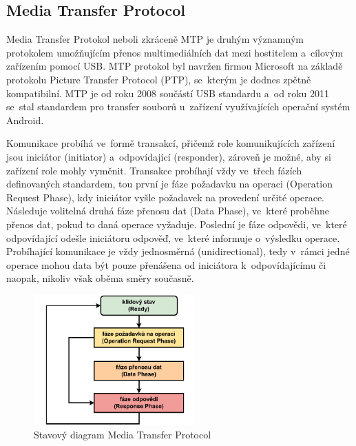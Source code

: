 \subsection{Media Transfer Protocol}
Media Transfer Protokol neboli zkráceně MTP je druhým významným protokolem umožňujícím přenos multimediálních dat mezi hostitelem a~cílovým zařízením pomocí USB. MTP protokol byl navržen firmou Microsoft na základě protokolu Picture Transfer Protocol (PTP), se~kterým je dodnes zpětně kompatibilní. MTP je od roku 2008 součástí USB standardu a~od roku 2011 se~stal standardem pro transfer souborů u~zařízení využívajících operační systém Android.~\cite{usb_standard_mtp}

Komunikace probíhá ve~formě transakcí, přičemž role komunikujících zařízení jsou iniciátor (initiator) a~odpovídající (responder), zároveň je možné, aby si zařízení role mohly vyměnit. Transakce probíhají vždy ve~třech fázích definovaných standardem, tou první je fáze požadavku na operaci (Operation Request Phase), kdy iniciátor vyšle požadavek na provedení určité operace. Následuje volitelná druhá fáze přenosu dat (Data Phase), ve~které proběhne přenos dat, pokud to daná operace vyžaduje. Poslední je fáze odpovědi, ve~které odpovídající odešle iniciátoru odpověď, ve~které informuje o~výsledku operace. Probíhající komunikace je vždy jednosměrná (unidirectional), tedy v~rámci jedné operace mohou data být pouze přenášena od iniciátora k~odpovídajícímu či naopak, nikoliv však oběma směry současně.~\cite{usb_standard_mtp}

\begin{figure}[h]
    \centering
    \includegraphics[width=0.55\textwidth]{obrazky-figures/mtp_phases.pdf}
    
    \caption{Stavový diagram Media Transfer Protocol~\cite{usb_standard_mtp}}
    \label{fig:mtp-protocol}
\end{figure}

